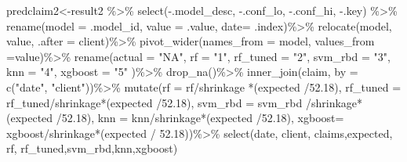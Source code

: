 \documentclass[
]{article}
\newenvironment{Shaded}{\begin{snugshade}}{\end{snugshade}}
\newcommand{\AttributeTok}[1]{\textcolor[rgb]{0.77,0.63,0.00}{#1}}
\newcommand{\FloatTok}[1]{\textcolor[rgb]{0.00,0.00,0.81}{#1}}
\newcommand{\FunctionTok}[1]{\textcolor[rgb]{0.00,0.00,0.00}{#1}}
\newcommand{\NormalTok}[1]{#1}
\newcommand{\OtherTok}[1]{\textcolor[rgb]{0.56,0.35,0.01}{#1}}
\newcommand{\SpecialCharTok}[1]{\textcolor[rgb]{0.00,0.00,0.00}{#1}}
\newcommand{\StringTok}[1]{\textcolor[rgb]{0.31,0.60,0.02}{#1}}
\begin{document}
\begin{Shaded}
\begin{Highlighting}[]
\NormalTok{predclaim2}\OtherTok{\textless{}{-}}\NormalTok{result2 }\SpecialCharTok{\%\textgreater{}\%}
  \FunctionTok{select}\NormalTok{(}\SpecialCharTok{{-}}\NormalTok{.model\_desc, }\SpecialCharTok{{-}}\NormalTok{.conf\_lo, }\SpecialCharTok{{-}}\NormalTok{.conf\_hi, }\SpecialCharTok{{-}}\NormalTok{.key) }\SpecialCharTok{\%\textgreater{}\%}
  \FunctionTok{rename}\NormalTok{(}\AttributeTok{model =}\NormalTok{ .model\_id, }\AttributeTok{value =}\NormalTok{ .value, }\AttributeTok{date=}\NormalTok{ .index)}\SpecialCharTok{\%\textgreater{}\%}
  \FunctionTok{relocate}\NormalTok{(model, value, }\AttributeTok{.after =}\NormalTok{ client)}\SpecialCharTok{\%\textgreater{}\%}
  \FunctionTok{pivot\_wider}\NormalTok{(}\AttributeTok{names\_from =}\NormalTok{ model, }\AttributeTok{values\_from =}\NormalTok{value)}\SpecialCharTok{\%\textgreater{}\%}
  \FunctionTok{rename}\NormalTok{(}\AttributeTok{actual =} \StringTok{"NA"}\NormalTok{, }\AttributeTok{rf =} \StringTok{"1"}\NormalTok{, }\AttributeTok{rf\_tuned =} \StringTok{"2"}\NormalTok{, }\AttributeTok{svm\_rbd =} \StringTok{"3"}\NormalTok{, }\AttributeTok{knn =} \StringTok{"4"}\NormalTok{, }\AttributeTok{xgboost =} \StringTok{"5"}\NormalTok{ )}\SpecialCharTok{\%\textgreater{}\%}
  \FunctionTok{drop\_na}\NormalTok{()}\SpecialCharTok{\%\textgreater{}\%}
 \FunctionTok{inner\_join}\NormalTok{(claim, }\AttributeTok{by =} \FunctionTok{c}\NormalTok{(}\StringTok{"date"}\NormalTok{, }\StringTok{"client"}\NormalTok{))}\SpecialCharTok{\%\textgreater{}\%}
  \FunctionTok{mutate}\NormalTok{(}\AttributeTok{rf =}\NormalTok{ rf}\SpecialCharTok{/}\NormalTok{shrinkage }\SpecialCharTok{*}\NormalTok{(expected }\SpecialCharTok{/}\FloatTok{52.18}\NormalTok{),}
         \AttributeTok{rf\_tuned =}\NormalTok{ rf\_tuned}\SpecialCharTok{/}\NormalTok{shrinkage}\SpecialCharTok{*}\NormalTok{(expected }\SpecialCharTok{/}\FloatTok{52.18}\NormalTok{),}
         \AttributeTok{svm\_rbd =}\NormalTok{ svm\_rbd }\SpecialCharTok{/}\NormalTok{shrinkage}\SpecialCharTok{*}\NormalTok{(expected }\SpecialCharTok{/}\FloatTok{52.18}\NormalTok{),}
         \AttributeTok{knn =}\NormalTok{ knn}\SpecialCharTok{/}\NormalTok{shrinkage}\SpecialCharTok{*}\NormalTok{(expected }\SpecialCharTok{/}\FloatTok{52.18}\NormalTok{),}
         \AttributeTok{xgboost=}\NormalTok{ xgboost}\SpecialCharTok{/}\NormalTok{shrinkage}\SpecialCharTok{*}\NormalTok{(expected }\SpecialCharTok{/} \FloatTok{52.18}\NormalTok{))}\SpecialCharTok{\%\textgreater{}\%}
  \FunctionTok{select}\NormalTok{(date, client, claims,expected, rf, rf\_tuned,svm\_rbd,knn,xgboost)}
\end{Highlighting}
\end{Shaded}
\end{document}
